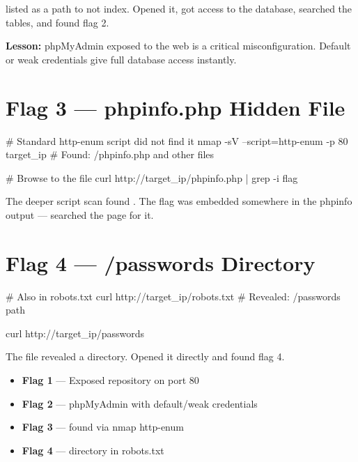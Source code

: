 \begin{takebox}

 listed  as a path to not index. Opened it,
got access to the database, searched the tables, and found flag 2.

\begin{takebox}
\textbf{Lesson:} phpMyAdmin exposed to the web is a critical misconfiguration.
Default or weak credentials give full database access instantly.
\end{takebox}

\section*{Flag 3 --- phpinfo.php Hidden File}

\begin{termbox}
# Standard http-enum script did not find it
nmap -sV --script=http-enum -p 80 target_ip
# Found: /phpinfo.php and other files

# Browse to the file
curl http://target_ip/phpinfo.php | grep -i flag
\end{termbox}

The deeper  script scan found . The flag was
embedded somewhere in the phpinfo output --- searched the page for it.

\section*{Flag 4 --- /passwords Directory}

\begin{termbox}
# Also in robots.txt
curl http://target_ip/robots.txt
# Revealed: /passwords path

curl http://target_ip/passwords
\end{termbox}

The  file revealed a  directory. Opened it
directly and found flag 4.

\begin{checkbox}
\begin{itemize}
  \item[$\checkmark$] \textbf{Flag 1} --- Exposed  repository on port 80
  \item[$\checkmark$] \textbf{Flag 2} --- phpMyAdmin with default/weak credentials
  \item[$\checkmark$] \textbf{Flag 3} ---  found via nmap http-enum
  \item[$\checkmark$] \textbf{Flag 4} ---  directory in robots.txt
\end{itemize}
\end{checkbox}


\end{takebox}